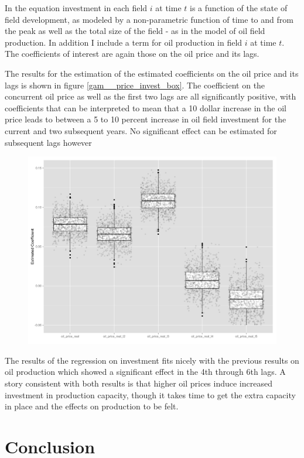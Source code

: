 \documentclass[12pt]{scrartcl} %
\begin{document}
In the equation investment in each field $i$ at time $t$ is a function of the state of field development, as modeled by a non-parametric function of time to and from the peak as well as the total size of the field - as in the model of oil field production.  In addition I include a term for oil production in field $i$ at time $t$.  The coefficients of interest are again those on the oil price and its lags.  

The results for the estimation of the estimated coefficients on the oil price and its lags is shown in figure \ref{gam__price_invest_box}.  The coefficient on the concurrent oil price as well as the first two lags are all significantly positive, with coefficients that can be interpreted to mean that a 10 dollar increase in the oil price leads to between a 5 to 10 percent increase in oil field investment for the current and two subsequent years.  No significant effect can be estimated for subsequent lags however

\begin{figure}
	\includegraphics[width=.8\textwidth]{gam_price_invest_box.png}
	\caption{}
	\label{gam_price_invest_box}
\end{figure}

The results of the regression on investment fits nicely with the previous results on oil production which showed a significant effect in the 4th through 6th lags.  A story consistent with both results is that higher oil prices induce increased investment in production capacity, though it takes time to get the extra capacity in place and the effects on production to be felt.

\section{Conclusion}
\end{document}
